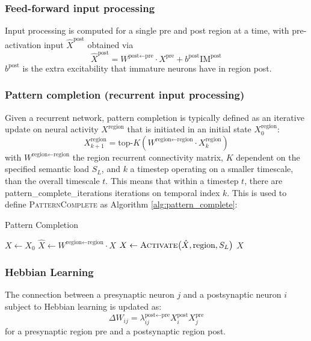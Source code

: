 \documentclass{article}
\begin{document}
\subsubsection*{Feed-forward input processing}
Input processing is computed for a single pre and post region at a time, with pre-activation input $\hat{X}^\textrm{post}$ obtained via
\begin{equation}
    \hat{X}^\textrm{post} = W^{\textrm{post}\leftarrow\textrm{pre}} \cdot X^\textrm{pre} + b^\textrm{post}\textrm{IM}^\textrm{post}
\end{equation}
$b^\textrm{post}$ is the extra excitability that immature neurons have in region post.
\subsubsection*{Pattern completion (recurrent input processing)}
Given a recurrent network, pattern completion is typically defined as an iterative update on neural activity $X^\textrm{region}$ that is initiated in an initial state $X^\textrm{region}_0$:
\begin{equation}
    X^{\textrm{region}}_{k+1} = \textrm{top-}K(W^{\textrm{region}\leftarrow\textrm{region}}\cdot X^\textrm{region}_{k})
\end{equation}
with $W^{\textrm{region}\leftarrow\textrm{region}}$ the region recurrent connectivity matrix, $K$ dependent on the specified semantic load $S_L$, and $k$ a timestep operating on a smaller timescale,  than the overall timescale $t$. This means that within a timestep $t$, there are pattern\_complete\_iterations iterations on temporal index $k$. This is used to define \textsc{PatternComplete}  as Algorithm \ref{alg:pattern_complete}:
\begin{algorithm}[h!]
\caption{Pattern Completion}\label{alg:pattern_complete}
\begin{algorithmic}[1]
    \State $X \gets X_0$
        \State $\hat{X} \gets W^{\textrm{region} \leftarrow \textrm{region}} \cdot X$
    \State $X \gets \textsc{Activate}\bigl(\hat{X}, \textrm{region}, S_L \bigr)$
    \EndFor
    \State \Return $X$
\EndFunction
\end{algorithmic}
\end{algorithm}
\subsubsection*{Hebbian Learning}
The connection between a presynaptic neuron $j$ and a postsynaptic neuron $i$ subject to Hebbian learning is updated as:
\begin{equation}
            \Delta W_{ij} = \lambda_{ij}^{\textrm{post} \leftarrow \textrm{pre}}
            X_i^\textrm{post} X_j^\textrm{pre}
\end{equation}
for a presynaptic region pre and a postsynaptic region post.
\end{document}
